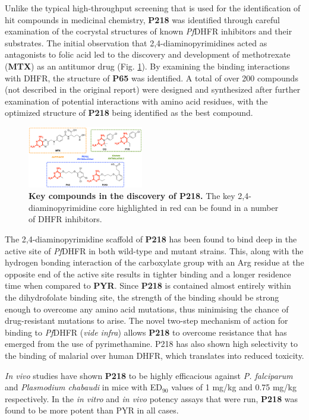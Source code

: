\documentclass[twocolumn]{bmcart}%
\begin{document}
Unlike the typical high-throughput screening that is used for the identification of hit compounds in medicinal chemistry, \textbf{P218} was identified through careful examination of the cocrystal structures of known \textit{Pf}DHFR inhibitors and their substrates. The initial observation that 2,4-diaminopyrimidines acted as antagonists to folic acid led to the discovery and development of methotrexate (\textbf{MTX}) as an antitumor drug (Fig. \ref{Figure19}). By examining the binding interactions with DHFR, the structure of \textbf{P65} was identified. A total of over 200 compounds (not described in the original report) were designed and synthesized after further examination of potential interactions with amino acid residues, with the optimized structure of \textbf{P218} being identified as the best compound.

\begin{figure}[h]
	\includegraphics [width=0.45\textwidth] {Figure19}
	\caption{{\bf Key compounds in the discovery of P218.} The key 2,4-diaminopyrimidine core highlighted in red can be found in a number of DHFR inhibitors.}
	\label{Figure19}
\end{figure}

The 2,4-diaminopyrimidine scaffold of \textbf{P218} has been found to bind deep in the active site of \textit{Pf}DHFR in both wild-type and mutant strains. This, along with the hydrogen bonding interaction of the carboxylate group with an Arg residue at the opposite end of the active site results in tighter binding and a longer residence time when compared to \textbf{PYR}. Since \textbf{P218} is contained almost entirely within the dihydrofolate binding site, the strength of the binding should be strong enough to overcome any amino acid mutations, thus minimising the chance of drug-resistant mutations to arise. The novel two-step mechanism of action for binding to \textit{Pf}DHFR (\textit{vide infra}) allows \textbf{P218} to overcome resistance that has emerged from the use of pyrimethamine. P218 has also shown high selectivity to the binding of malarial over human DHFR, which translates into reduced toxicity.

\textit{In vivo} studies have shown \textbf{P218} to be highly efficacious against \textit{P. falciparum} and \textit{Plasmodium chabaudi} in mice with ED$_{90}$ values of 1 mg/kg and 0.75 mg/kg respectively. In the \textit{in vitro} and \textit{in vivo} potency assays that were run, \textbf{P218} was found to be more potent than PYR in all cases.
\end{document}
